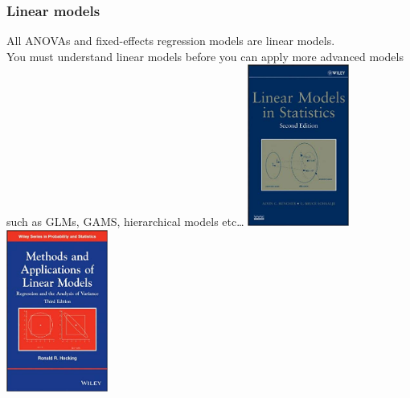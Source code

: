 \documentclass[color=usenames,dvipsnames]{beamer}\usepackage[]{graphicx}\usepackage[]{color}
\begin{document}
\begin{frame}
  \frametitle{Linear models}
  All ANOVAs and fixed-effects regression models are linear models. \\
  \vspace{12pt}
  You must understand linear models before you can apply more advanced
  models such as GLMs, GAMS, hierarchical models etc\dots  
  \vfill
  \centering
  \includegraphics[width=0.25\textwidth]{figure/Rencher_Schaal_book} \hspace{1cm}
  \includegraphics[width=0.25\textwidth]{figure/Hocking_book} \\
\end{frame}
\end{document}
